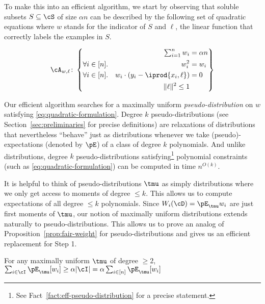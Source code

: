 To make this into an efficient algorithm, we start by observing that soluble subsets $S \subseteq \cS$ of size $\alpha n$ can be described by the following set of quadratic equations where $w$ stands for the indicator of $S$ and $\ell$, the linear function that correctly labels the examples in $S$. 

\begin{equation} \label{eq:quadratic-formulation}
  \cA_{w,\ell}\colon
  \left \{
    \begin{aligned}
      &&
      \textstyle\sum_{i=1}^n w_i
      &= \alpha n\\
      &\forall i\in [n].
      & w_i^2
      & =w_i \\
      &\forall i\in [n].
      & w_i \cdot (y_i - \iprod{x_i,\ell})
      & = 0\\
      &
      &\|\ell\|^2 \leq 1\\
    \end{aligned}
  \right \}
\end{equation} 

Our efficient algorithm searches for a maximally uniform \emph{pseudo-distribution} on $w$ satisfying \eqref{eq:quadratic-formulation}. Degree $k$ pseudo-distributions (see Section~\ref{sec:preliminaries} for precise definitions) are relaxations of distributions that nevertheless ``behave'' just as distributions whenever we take (pseudo)-expectations (denoted by $\pE$) of a class of degree $k$ polynomials. And unlike distributions, degree $k$ pseudo-distributions satisfying\footnote{See Fact~\ref{fact:eff-pseudo-distribution} for a precise statement.} polynomial constraints (such as \eqref{eq:quadratic-formulation}) can be computed in time $n^{O(k)}$. 

It is helpful to think of pseudo-distributions $\tmu$ as simply distributions where we only get access to moments of degree $\leq k$. This allows us to compute expectations of all degree $\leq k$ polynomials. Since $W_i(\cD) = \pE_{\tmu} w_i$ are just first moments of $\tmu$, our notion of maximally uniform distributions extends naturally to pseudo-distributions. This allows us to prove an analog of Proposition~\ref{prop:fair-weight} for pseudo-distributions and gives us an efficient replacement for Step 1.

\begin{proposition}
For any maximally uniform $\tmu$ of degree $\geq 2$,  $\sum_{i \in \cI} \pE_{\tmu}[w_i]  \geq \alpha |\cI| = \alpha \sum_{i\in [n]} \pE_{\tmu}[w_i]$\mper\label{prop:good-weight-on-inliers}
\end{proposition} 

